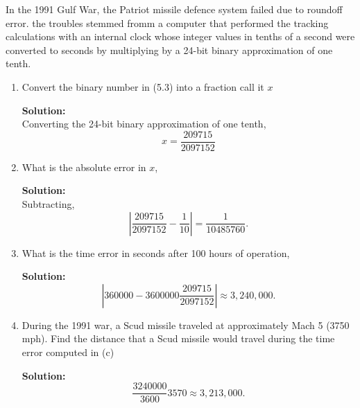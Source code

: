 \documentclass[12pt]{article}
\makeatletter
\theoremstyle{homework}
\newenvironment{exercise}[1]
{\def\@currentlabel{#1}\exercisecore}
{\endexercisecore}
\newcommand{\localhead}[1]{\par\smallskip\noindent\textbf{#1}\nobreak\\}%
\newcommand\solution{\localhead{Solution:}}
\makeatother
\begin{document}
\begin{exercise} {Problem 5.15} In the 1991 Gulf War, the Patriot missile defence system failed due to roundoff error. 
  the troubles stemmed fromm a computer that performed the tracking calculations with an internal clock whose integer values in tenths
  of a second were converted to seconds by multiplying by a 24-bit binary approximation of one tenth.\\
  \begin{enumerate}
    \item Convert the binary number in (5.3) into a fraction call it $x$\\
    
    \solution Converting the 24-bit binary approximation of one tenth,
    \begin{equation*}
      x = \dfrac{209715}{2097152}
    \end{equation*}

\item What is the absolute error in $x$,\\

\solution Subtracting,
\begin{equation*}
  |\dfrac{209715}{2097152} -\dfrac{1}{10}| = \dfrac{1}{10485760}.
\end{equation*}


\item What is the time error in seconds after 100 hours of operation,\\

\solution 
\begin{equation*}
  |360000-3600000\frac{209715}{2097152}| \approx 3,240,000.
\end{equation*}

\item  During the 1991 war, a Scud missile traveled at  approximately Mach 5 (3750 mph). Find the distance that a Scud missile would travel during the time error computed in (c)
\solution
\begin{equation*}
  \frac{3240000}{3600}3570 \approx 3,213,000.
\end{equation*}




  \end{enumerate}










\end{exercise}
\end{document}
